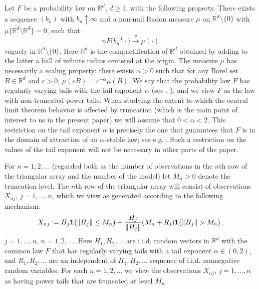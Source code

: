 \documentclass[11pt]{amsart}
\numberwithin{equation}{section}
\begin{document}
Let $F$ be a probability law on ${{\mathbb R}}^d$, $d\geq 1$,
with the following property. There exists a sequence $(b_n)$ with
$b_n\uparrow\infty$ and a non-null Radon measure $\mu$ on
${\overline{{{\mathbb R}}^d}}\setminus\{0\}$ with $\mu\bigl\{ {\overline{{{\mathbb R}}^d}}\setminus
{{\mathbb R}}^d\}=0$, such that
\begin{equation} \label{e:power.tails}
nF\bigl( b_n^{-1}\cdot\bigr){\stackrel{v}{\longrightarrow}} \mu(\cdot)
\end{equation}
vaguely in ${\overline{{{\mathbb R}}^d}}\setminus\{0\}$. Here ${\overline{{{\mathbb R}}^d}}$ is the
compactification of ${{\mathbb R}}^d$ obtained by adding to the latter a
ball of infinite radius centered at the origin. The measure $\mu$
has necessarily a scaling property: there exists $\alpha>0$ such
that for any Borel set $B\in {{\mathbb R}}^d$ and $c>0$, $\mu(cB) =
c^{-\alpha}\mu(B)$. We say that the probability law $F$ has
regularly varying tails with the tail exponent $\alpha$ (see
\cite{resnick:1987},
\cite{hult:lindskog:mikosch:samorodnitsky:2005}), and  we view $F$
as the law with non-truncated power tails. When studying the
extent to which the central limit theorem behavior is affected by
truncation (which is the main point of interest to us in the
present paper) we will assume that $0<\alpha<2$. This restriction
on the tail exponent $\alpha$ is precisely the one that guarantees
that $F$ is in the domain of attraction of an $\alpha$-stable law;
see e.g. \cite{rvaceva:1962}. Such a restriction on the values of
the tail exponent will not be necessary in other parts of the
paper.

For $n=1,2,\ldots$ (regarded both as the number of observations in
the $n$th row of the triangular array and the number of the model)
let $M_n>0$ denote the truncation level. The $n$th row of the
triangular array will consist of observations $X_{nj},\,
j=1,\ldots, n$, which we view as generated according to the
following mechanism:
\begin{equation}\label{e:the.model}
X_{nj}:=H_j{{\bf 1}}\bigl(\|H_j\|\le  M_n\bigr)
+\frac{H_j}{\|H_j\|}(M_n+R_j){{\bf 1}}\bigl(\|H_j\|>M_n\bigr)\,,
\end{equation}
$j=1,\ldots, n, \, n=1,2,\ldots$.
Here $H_1,H_2,\ldots$ are i.i.d. random vectors in ${{\mathbb R}}^d$ with the
common law $F$ that has regularly
varying tails with a tail exponent $\alpha\in (0,2)$,
and $R_1,R_2,\ldots$ are an independent of
$H_1,H_2,\ldots$ sequence of i.i.d. nonnegative random variables. For
each $n=1,2,\ldots$ we view the observations $X_{nj},\, j=1,\ldots, n$
as having power tails that are truncated at level $M_n$.
\end{document}
